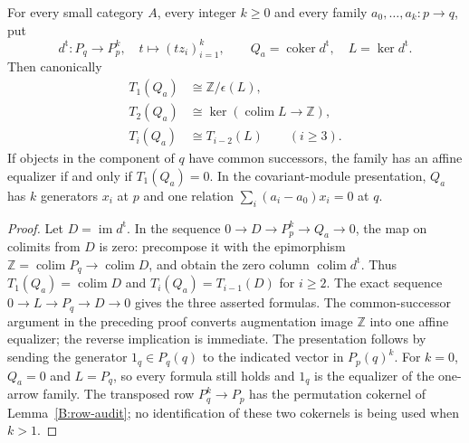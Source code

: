 \begin{proposition}\label{B:lead3}
For every small category $A$, every integer $k\geq0$ and every family
$a_0,\ldots,a_k:p\to q$, put
\[
 d^{\mathrm t}:P_q\longrightarrow P_p^k,
 \quad t\longmapsto(tz_i)_{i=1}^k,
 \qquad Q_a=\operatorname{coker}d^{\mathrm t},
 \quad L=\ker d^{\mathrm t}.
\]
Then canonically
\begin{align*}
 T_1(Q_a)&\cong\mathbb Z/\epsilon(L),\\
 T_2(Q_a)&\cong\ker(\operatorname{colim}L\to\mathbb Z),\\
 T_i(Q_a)&\cong T_{i-2}(L)\qquad(i\geq3).
\end{align*}
If objects in the component of $q$ have common successors, the family
has an affine equalizer if and only if $T_1(Q_a)=0$.
In the covariant-module presentation, $Q_a$ has $k$ generators $x_i$
at $p$ and one relation $\sum_i(a_i-a_0)x_i=0$ at $q$.
\end{proposition}
\begin{proof}
Let $D=\operatorname{im}d^{\mathrm t}$.  In the sequence
$0\to D\to P_p^k\to Q_a\to0$, the map on colimits from $D$
is zero: precompose it with the epimorphism
$\mathbb Z=\operatorname{colim}P_q\to\operatorname{colim}D$,
and obtain the zero column $\operatorname{colim}d^{\mathrm t}$.
Thus $T_1(Q_a)=\operatorname{colim}D$ and
$T_i(Q_a)=T_{i-1}(D)$ for $i\geq2$.
The exact sequence $0\to L\to P_q\to D\to0$ gives the three
asserted formulas.  The common-successor argument in the preceding
proof converts augmentation image $\mathbb Z$ into one affine
equalizer; the reverse implication is immediate.  The presentation
follows by sending the generator $1_q\in P_q(q)$ to the indicated
vector in $P_p(q)^k$.  For $k=0$, $Q_a=0$ and $L=P_q$, so every
formula still holds and $1_q$ is the equalizer of the one-arrow family.
The transposed row $P_q^k\to P_p$ has the permutation cokernel of
Lemma~\ref{B:row-audit}; no identification of these two cokernels is
being used when $k>1$.
\end{proof}

